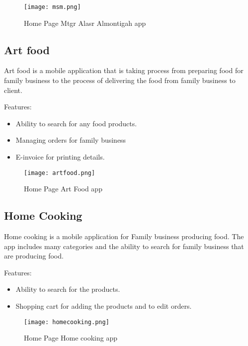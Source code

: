 \documentclass[11pt]{article}
\newcommand\tab[1][1cm]{\hspace*{#1}}
\begin{document}
\begin{figure} [h]
\begin{center}
\texttt{[image: msm.png]}
\end{center}
\caption{Home Page Mtgr Alasr Almontigah app}
  \label{fig:mtgr-alasr-almontigah}
\end{figure}
\clearpage 
\newpage 

\subsection{Art food}
\tab Art food is a mobile application that is taking process from preparing food for family business to the process of delivering the food from family business to client. 

Features:

\begin{itemize}
\item Ability to search for any food products.
\item Managing orders for family business
\item E-invoice for printing details.
\end{itemize}


\begin{figure} [h]
\begin{center}
\texttt{[image: artfood.png]}
\end{center}
\caption{Home Page Art Food app}
  \label{fig:artfood}
\end{figure}
\clearpage 
\newpage 

\subsection{Home Cooking}
\tab 
Home cooking is a mobile application for Family business producing food. The app includes many categories and the ability to search for family business that are producing food.

Features: 
\begin{itemize}

\item Ability to search for the products.
\item Shopping cart for adding the products and to edit orders.



\end{itemize}


\begin{figure} [h]
\begin{center}
\texttt{[image: homecooking.png]}
\end{center}
\caption{Home Page Home cooking app}
  \label{fig:homecooking}
\end{figure}
\clearpage 
\newpage 
\end{document}
